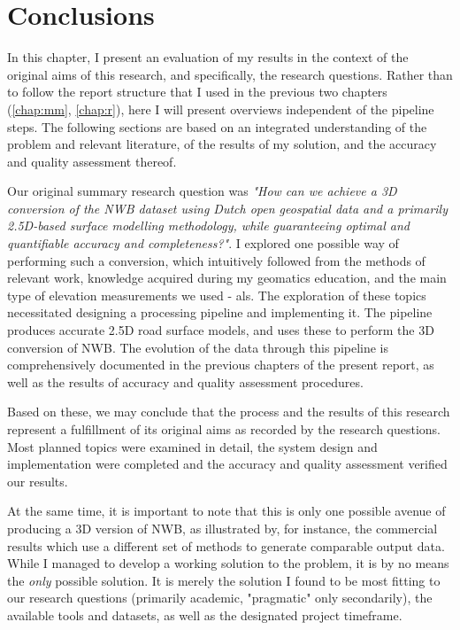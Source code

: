 
\chapter{Conclusions}
\label{chap:c}

In this chapter, I present an evaluation of my results in the context of the original aims of this research, and specifically, the research questions. Rather than to follow the report structure that I used in the previous two chapters (\ref{chap:mm}, \ref{chap:r}), here I will present overviews independent of the pipeline steps. The following sections are based on an integrated understanding of the problem and relevant literature, of the results of my solution, and the accuracy and quality assessment thereof.

Our original summary research question was \textit{"How can we achieve a 3D conversion of the NWB dataset using Dutch open geospatial data and a primarily 2.5D-based surface modelling methodology, while guaranteeing optimal and quantifiable accuracy and completeness?"}. I explored one possible way of performing such a conversion, which intuitively followed from the methods of relevant work, knowledge acquired during my geomatics education, and the main type of elevation measurements we used - \ac{als}. The exploration of these topics necessitated designing a processing pipeline and implementing it. The pipeline produces accurate 2.5D road surface models, and uses these to perform the 3D conversion of NWB. The evolution of the data through this pipeline is comprehensively documented in the previous chapters of the present report, as well as the results of accuracy and quality assessment procedures.

Based on these, we may conclude that the process and the results of this research represent a fulfillment of its original aims as recorded by the research questions. Most planned topics were examined in detail, the system design and implementation were completed and the accuracy and quality assessment verified our results.

At the same time, it is important to note that this is only one possible avenue of producing a 3D version of NWB, as illustrated by, for instance, the commercial results which use a different set of methods to generate comparable output data. While I managed to develop a working solution to the problem, it is by no means the \textit{only} possible solution. It is merely the solution I found to be most fitting to our research questions (primarily academic, "pragmatic" only secondarily), the available tools and datasets, as well as the designated project timeframe.

